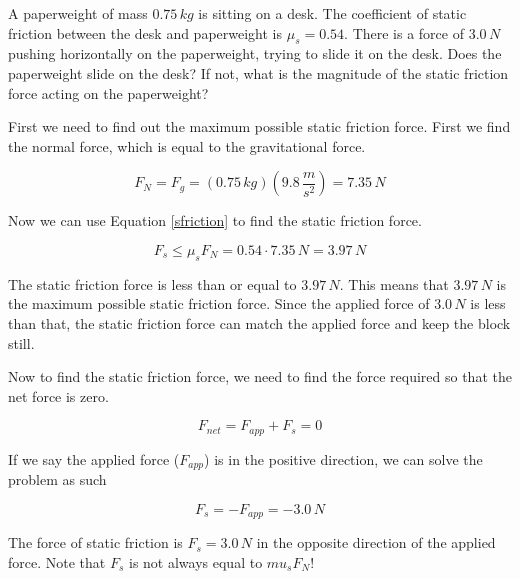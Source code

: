 \documentclass[12pt]{book}
\begin{document}
\begin{exampleblock}

A paperweight of mass $0.75 \, kg$ is sitting on a desk. The coefficient of static friction between the desk and paperweight is $\mu_s = 0.54$. There is a force of $3.0 \, N$ pushing horizontally on the paperweight, trying to slide it on the desk. Does the paperweight slide on the desk? If not, what is the magnitude of the static friction force acting on the paperweight?

\hspace{10pt}

First we need to find out the maximum possible static friction force. First we find the normal force, which is equal to the gravitational force.

\begin{equation}
F_N = F_g = (0.75 \, kg) (9.8 \, \frac{m}{s^2}) = 7.35 \, N
\end{equation}

Now we can use Equation \ref{sfriction} to find the static friction force.

\begin{equation}
F_s \leq \mu_s F_N = 0.54 \cdot 7.35 \, N = 3.97 \, N
\end{equation}

The static friction force is less than or equal to $3.97 \, N$. This means that $3.97 \, N$ is the maximum possible static friction force. Since the applied force of $3.0 \, N$ is less than that, the static friction force can match the applied force and keep the block still.

Now to find the static friction force, we need to find the force required so that the net force is zero. 

\begin{equation}
F_{net} = F_{app} + F_s = 0
\end{equation}

If we say the applied force ($F_{app}$) is in the positive direction, we can solve the problem as such

\begin{equation}
F_s = -F_{app} = - 3.0 \, N
\end{equation}

The force of static friction is $F_s = 3.0 \, N$ in the opposite direction of the applied force. Note that $F_s$ is not always equal to $mu_s F_N$!

\end{exampleblock}
\end{document}
